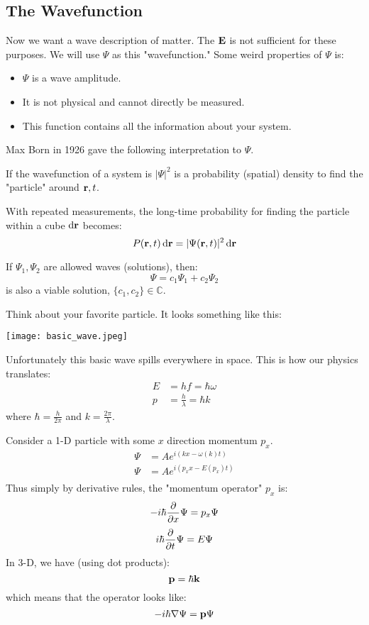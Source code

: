 \subsection{The Wavefunction}
Now we want a wave description of matter. The $\mathbf{E}$ is not sufficient for these purposes. We will use $\Psi$ as this "wavefunction." Some weird properties
of $\Psi$ is:
\begin{itemize}
    \item $\Psi$ is a wave amplitude.
    \item It is not physical and cannot directly be measured.
    \item This function contains all the information about your system.
\end{itemize}
Max Born in 1926 gave the following interpretation to $\Psi$.
\begin{theorem}
    If the wavefunction of a system is $|\Psi|^2$ is a probability (spatial) density to find the "particle" around $\mathbf{r}, t$.
\end{theorem}
With repeated measurements, the long-time probability for finding the particle within a cube $\dd{\mathbf{r}}$ becomes:
\[ P(\mathbf{r}, t) \dd{\mathbf{r}} = |\Psi(\mathbf{r}, t)|^2 \dd{\mathbf{r}} \]
\begin{theorem}[Superposition]
    If $\Psi_1, \Psi_2$ are allowed waves (solutions), then:
    \[ \Psi = c_1 \Psi_1 + c_2 \Psi_2 \]
    is also a viable solution, $\{c_1, c_2\} \in \mathbb{C}$.
\end{theorem}
Think about your favorite particle. It looks something like this:

\texttt{[image: basic\_wave.jpeg]}

Unfortunately this basic wave spills everywhere in space. This is how our physics translates: 
\begin{align*}
    E &= hf = \hbar \omega \\
    p &= \frac{h}{\lambda} = \hbar k
\end{align*}
where $\hbar = \frac{h}{2\pi}$ and $k = \frac{2\pi}{\lambda}$.

Consider a 1-D particle with some $x$ direction momentum $p_x$.
\begin{align*}
    \Psi &= A e^{i(k x - \omega(k) t)} \\
    \Psi &= Ae^{i(p_x x - E(p_x) t)} \\
\end{align*}
Thus simply by derivative rules, the "momentum operator" $p_x$ is:
\[ - i \hbar \partialderivative{}{x} \Psi = p_x \Psi \]
\[ i \hbar \partialderivative{}{t} \Psi = E \Psi \]
In 3-D, we have (using dot products):
\[ \mathbf{p} = \hbar \mathbf{k} \]
which means that the operator looks like:
\[ - i \hbar \nabla \Psi = \mathbf{p} \Psi\]
